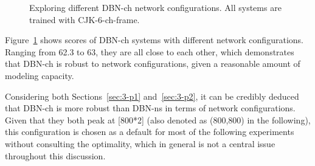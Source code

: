  \label{sec:3-p2}

\begin{figure}[htb]
\centering
{}
\caption{Exploring different DBN-ch network configurations. All systems are trained with CJK-6-ch-frame.}
\label{fig:3-dbn-ch-configs}
\end{figure}

Figure~\ref{fig:3-dbn-ch-configs} shows scores of DBN-ch systems with different network configurations. Ranging from 62.3 to 63, they are all close to each other, which demonstrates that DBN-ch is robust to network configurations, given a reasonable amount of modeling capacity.


Considering both Sections~\ref{sec:3-p1} and~\ref{sec:3-p2}, it can be credibly deduced that DBN-ch is more robust than DBN-ns in terms of network configurations. Given that they both peak at [800*2] (also denoted as (800,800) in the following), this configuration is chosen as a default for most of the following experiments without consulting the optimality, which in general is not a central issue throughout this discussion.

 \label{sec:3-p3}


